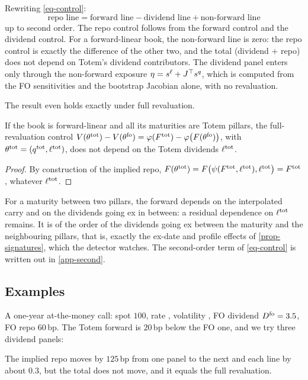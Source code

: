 \begin{reponse}
Rewriting \eqref{eq-control}:
\[
\boxed{\;\text{repo line}=\text{forward line}-\text{dividend line}+\text{non-forward line}\;}
\]
up to second order. The repo control follows from the forward control and the dividend control. For a forward-linear
book, the non-forward line is zero: the repo control is exactly the difference of the other two, and the total
(dividend $+$ repo) does not depend on Totem's dividend contributors. The dividend panel enters only through the
non-forward exposure $\eta=s^\ell+{J}^{\top}s^q$, which is computed from the FO sensitivities and the bootstrap Jacobian
alone, with no revaluation.
\end{reponse}

The result even holds exactly under full revaluation.

\begin{theorem}\label{thm-exact}
If the book is forward-linear and all its maturities are Totem pillars, the full-revaluation control
$V(\theta^{\mathrm{tot}})-V(\theta^{\mathrm{fo}})=\varphi(F^{\mathrm{tot}})-\varphi\bigl(F(\theta^{\mathrm{fo}})\bigr)$, with
$\theta^{\mathrm{tot}}=(q^{\mathrm{tot}}, \ell^{\mathrm{tot}})$, does not depend on the Totem dividends $\ell^{\mathrm{tot}}$.
\end{theorem}
\begin{proof}
By construction of the implied repo, $F(\theta^{\mathrm{tot}})=F\bigl(\psi(F^{\mathrm{tot}}, \ell^{\mathrm{tot}}), \ell^{\mathrm{tot}}\bigr)=F^{\mathrm{tot}}$,
whatever $\ell^{\mathrm{tot}}$.
\end{proof}

\begin{remark}
For a maturity between two pillars, the forward depends on the interpolated carry and on the dividends going ex in
between: a residual dependence on $\ell^{\mathrm{tot}}$ remains. It is of the order of the dividends going ex between the
maturity and the neighbouring pillars, that is, exactly the ex-date and profile effects of \cref{prop-signatures}, which
the detector watches. The second-order term of \eqref{eq-control} is written out in \cref{app-second}.
\end{remark}

\subsection{Examples}
\begin{example}[A call]\label{ex-call}
A one-year at-the-money call: spot $100$, rate , volatility , FO dividend $D^{\mathrm{fo}}=\num{3.5}$, FO repo
$60$\,bp. The Totem forward is $20$\,bp below the FO one, and we try three dividend panels:
\begin{center}\end{center}
The implied repo moves by $125$\,bp from one panel to the next and each line by about $\num{0.3}$, but the total does
not move, and it equals the full revaluation.
\end{example}

